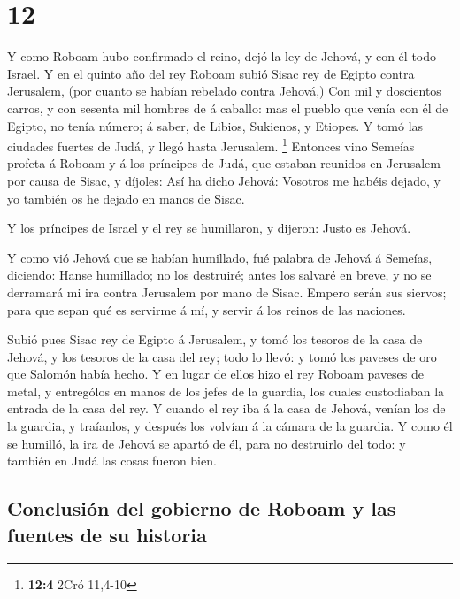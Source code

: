 \hypertarget{section-11}{%
\section{12}\label{section-11}}

 Y como Roboam hubo confirmado el reino, dejó la ley de
Jehová, y con él todo Israel.  Y en el quinto año del rey
Roboam subió Sisac rey de Egipto contra Jerusalem, (por cuanto se habían
rebelado contra Jehová,)  Con mil y doscientos carros, y con
sesenta mil hombres de á caballo: mas el pueblo que venía con él de
Egipto, no tenía número; á saber, de Libios, Sukienos, y Etiopes.
 Y tomó las ciudades fuertes de Judá, y llegó hasta
Jerusalem. \footnote{\textbf{12:4} 2Cró 11,4-10}  Entonces
vino Semeías profeta á Roboam y á los príncipes de Judá, que estaban
reunidos en Jerusalem por causa de Sisac, y díjoles: Así ha dicho
Jehová: Vosotros me habéis dejado, y yo también os he dejado en manos de
Sisac.

 Y los príncipes de Israel y el rey se humillaron, y
dijeron: Justo es Jehová.

 Y como vió Jehová que se habían humillado, fué palabra de
Jehová á Semeías, diciendo: Hanse humillado; no los destruiré; antes los
salvaré en breve, y no se derramará mi ira contra Jerusalem por mano de
Sisac.  Empero serán sus siervos; para que sepan qué es
servirme á mí, y servir á los reinos de las naciones.

 Subió pues Sisac rey de Egipto á Jerusalem, y tomó los
tesoros de la casa de Jehová, y los tesoros de la casa del rey; todo lo
llevó: y tomó los paveses de oro que Salomón había hecho. 
Y en lugar de ellos hizo el rey Roboam paveses de metal, y entrególos en
manos de los jefes de la guardia, los cuales custodiaban la entrada de
la casa del rey.  Y cuando el rey iba á la casa de Jehová,
venían los de la guardia, y traíanlos, y después los volvían á la cámara
de la guardia.  Y como él se humilló, la ira de Jehová se
apartó de él, para no destruirlo del todo: y también en Judá las cosas
fueron bien.

\hypertarget{conclusiuxf3n-del-gobierno-de-roboam-y-las-fuentes-de-su-historia}{%
\subsection{Conclusión del gobierno de Roboam y las fuentes de su
historia}\label{conclusiuxf3n-del-gobierno-de-roboam-y-las-fuentes-de-su-historia}}

